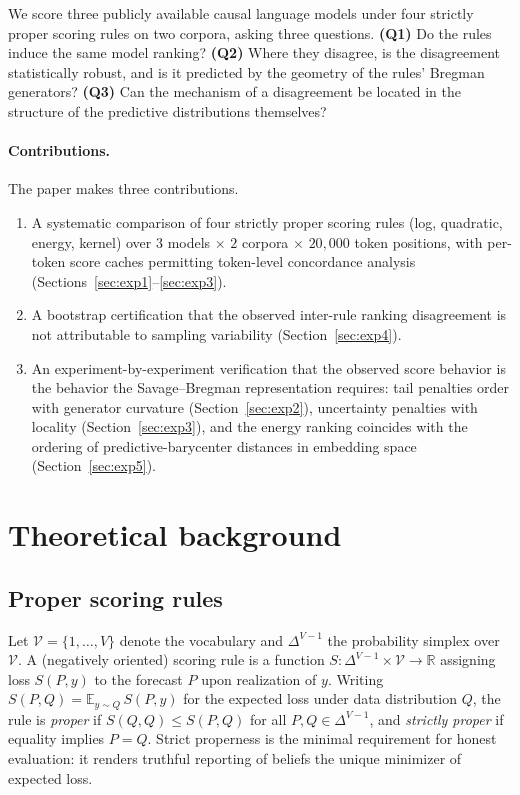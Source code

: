 \documentclass{article}
\newcommand{\simplex}{\Delta^{V-1}}
\begin{document}
We score three publicly available causal language models under four strictly proper
scoring rules on two corpora, asking three questions. \textbf{(Q1)} Do the rules induce
the same model ranking? \textbf{(Q2)} Where they disagree, is the disagreement
statistically robust, and is it predicted by the geometry of the rules' Bregman
generators? \textbf{(Q3)} Can the mechanism of a disagreement be located in the
structure of the predictive distributions themselves?

\paragraph{Contributions.} The paper makes three contributions.
\begin{enumerate}
  \item A systematic comparison of four strictly proper scoring rules (log, quadratic,
        energy, kernel) over $3$ models $\times$ $2$ corpora $\times$ $20{,}000$ token
        positions, with per-token score caches permitting token-level concordance
        analysis (Sections~\ref{sec:exp1}--\ref{sec:exp3}).
  \item A bootstrap certification that the observed inter-rule ranking disagreement is
        not attributable to sampling variability (Section~\ref{sec:exp4}).
  \item An experiment-by-experiment verification that the observed score behavior is
        the behavior the Savage--Bregman representation requires: tail penalties order
        with generator curvature (Section~\ref{sec:exp2}), uncertainty penalties with
        locality (Section~\ref{sec:exp3}), and the energy ranking coincides with the
        ordering of predictive-barycenter distances in embedding space
        (Section~\ref{sec:exp5}).
\end{enumerate}

\section{Theoretical background}
\label{sec:theory}

\subsection{Proper scoring rules}

Let $\mathcal{V} = \{1,\dots,V\}$ denote the vocabulary and $\simplex$ the probability
simplex over $\mathcal{V}$. A (negatively oriented) scoring rule is a function
$S : \simplex \times \mathcal{V} \to \mathbb{R}$ assigning loss $S(P,y)$ to the forecast
$P$ upon realization of $y$. Writing $S(P,Q) = \mathbb{E}_{y\sim Q}\, S(P,y)$ for the
expected loss under data distribution $Q$, the rule is \emph{proper} if
$S(Q,Q) \le S(P,Q)$ for all $P, Q \in \simplex$, and \emph{strictly proper} if equality
implies $P = Q$. Strict properness is the minimal requirement for honest evaluation: it
renders truthful reporting of beliefs the unique minimizer of expected loss.
\end{document}
